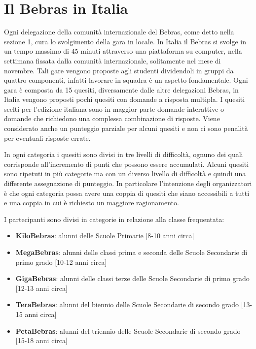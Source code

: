 \documentclass[12pt]{report}
\begin{document}
%
\section{Il Bebras in Italia}
Ogni delegazione della comunità internazionale del Bebras, come detto nella sezione 1, cura lo svolgimento della gara in locale.
In Italia il Bebras si svolge in un tempo massimo di 45 minuti attraverso una piattaforma su computer, nella settimana fissata dalla comunità internazionale, solitamente nel mese di novembre. Tali gare vengono proposte agli studenti dividendoli in gruppi da quattro componenti, infatti lavorare in squadra è un aspetto fondamentale.
Ogni gara è composta da 15 quesiti, diversamente dalle altre delegazioni Bebras, in Italia vengono proposti pochi quesiti con domande a risposta multipla. I quesiti scelti per l'edizione italiana sono in maggior parte domande interattive o domande che richiedono una complessa combinazione di risposte. Viene considerato anche un punteggio parziale per alcuni quesiti e non ci sono penalità per eventuali risposte errate.

In ogni categoria i quesiti sono divisi in tre livelli di difficoltà, ognuno dei quali corrisponde all'incremento di punti che possono essere accumulati.
Alcuni quesiti sono ripetuti in più categorie ma con un diverso livello di difficoltà e quindi una differente assegnazione di punteggio. In particolare l'intenzione degli organizzatori è che ogni categoria possa avere una coppia di quesiti che siano accessibili a tutti e una coppia in cui è richiesto un maggiore ragionamento. 

I partecipanti sono divisi in categorie in relazione alla classe frequentata:
\begin{itemize}
	\item \textbf{KiloBebras}: alunni delle Scuole Primarie [8-10 anni circa]
	\item \textbf{MegaBebras}: alunni delle classi prima e seconda delle Scuole Secondarie di primo grado [10-12 anni circa]
	\item \textbf{GigaBebras}: alunni delle classi terze delle Scuole Secondarie di primo grado [12-13 anni circa]
	\item \textbf{TeraBebras}: alunni del biennio delle Scuole Secondarie di secondo grado [13-15 anni circa]
	\item \textbf{PetaBebras}: alunni del triennio delle Scuole Secondarie di secondo grado [15-18 anni circa]
\end{itemize}
\end{document}
